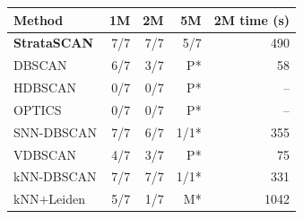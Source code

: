 \begin{tabular}{@{}lrrrr@{}}
\toprule
Method & 1M & 2M & 5M & 2M time (s) \\
\midrule
\textbf{StrataSCAN} & 7/7 & 7/7 & 5/7 & 490 \\
DBSCAN & 6/7 & 3/7 & P* & 58 \\
HDBSCAN & 0/7 & 0/7 & P* & -- \\
OPTICS & 0/7 & 0/7 & P* & -- \\
SNN-DBSCAN & 7/7 & 6/7 & 1/1* & 355 \\
VDBSCAN & 4/7 & 3/7 & P* & 75 \\
kNN-DBSCAN & 7/7 & 7/7 & 1/1* & 331 \\
kNN$+$Leiden & 5/7 & 1/7 & M* & 1042 \\
\bottomrule
\end{tabular}

